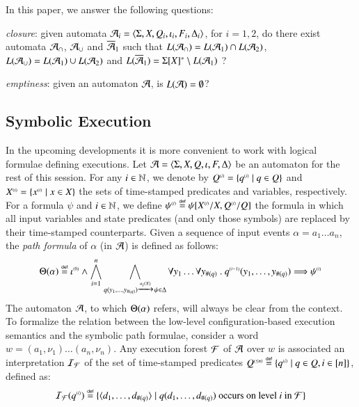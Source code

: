 \documentclass{llncs}
\begin{document}
In this paper, we answer the following questions: \begin{compactenum}
\item \emph{closure}: given automata $\mathcal{A}_i =
  \langle \Sigma,X,Q_i,\iota_i,F_i,\Delta_i \rangle$, for $i=1,2$, do there
  exist automata $\mathcal{A}_\cap$, $\mathcal{A}_\cup$ and $\overline{\mathcal{A}}_1$ such that
  $L(\mathcal{A}_\cap) = L(\mathcal{A}_1) \cap L(\mathcal{A}_2)$, $L(\mathcal{A}_\cup) = L(\mathcal{A}_1) \cup
  L(\mathcal{A}_2)$ and $L(\overline{\mathcal{A}}_1) = \Sigma[X]^* \setminus L(\mathcal{A}_1)$ ?
%
\item \emph{emptiness}: given an automaton $\mathcal{A}$, is $L(\mathcal{A}) =
  \emptyset$?
\end{compactenum}

\subsection{Symbolic Execution}

In the upcoming developments it is more convenient to work with
logical formulae defining executions. Let $\mathcal{A} =
\langle \Sigma,X,Q,\iota,F,\Delta \rangle$ be an automaton for the rest of
this session. For any $i \in {\bf \mathbb{N}}$, we denote by ${Q}^{\scriptscriptstyle{({i})}} =
\{ {q}^{\scriptscriptstyle{({i})}} \mid q \in Q \}$ and ${X}^{\scriptscriptstyle{({i})}} = \{ {x}^{\scriptscriptstyle{({i})}}
  \mid x \in X \}$ the sets of time-stamped predicates and variables,
respectively. For a formula $\psi$ and $i \in {\bf \mathbb{N}}$, we define
${\psi}^{\scriptscriptstyle{({i})}} \stackrel{\scriptscriptstyle{\mathsf{def}}}{=} \psi[{X}^{\scriptscriptstyle{({i})}}/X,{Q}^{\scriptscriptstyle{({i})}}/Q]$ the
formula in which all input variables and state predicates (and only
those symbols) are replaced by their time-stamped counterparts. Given
a sequence of input events $\alpha = a_1 \ldots a_n$, the \emph{path
  formula} of $\alpha$ (in $\mathcal{A}$) is defined as follows:
\[\Theta({\alpha}) \stackrel{\scriptscriptstyle{\mathsf{def}}}{=} {\iota}^{\scriptscriptstyle{({0})}} \wedge 
\bigwedge_{i=1}^n \bigwedge_{q(y_1,\ldots,y_{\#(q)}) \xrightarrow{{\scriptscriptstyle a_i(X)}}_{{\scriptstyle }}
  \psi \in \Delta} \forall y_1 \ldots \forall y_{\#(q)} ~.~
{q}^{\scriptscriptstyle{({i-1})}}(y_1,\ldots,y_{\#(q)}) \Longrightarrow {\psi}^{\scriptscriptstyle{({i})}}\]
The automaton $\mathcal{A}$, to which $\Theta({\alpha})$ refers, will always
be clear from the context. To formalize the relation between the
low-level configuration-based execution semantics and the symbolic
path formulae, consider a word $w=(a_1,\nu_1) \ldots (a_n,\nu_n)$. Any
execution forest $\mathcal{F}$ of $\mathcal{A}$ over $w$ is associated an interpretation
$\mathcal{I}_{\mathcal{F}}$ of the set of time-stamped predicates ${Q}^{\scriptscriptstyle{({\leq n})}}
\stackrel{\scriptscriptstyle{\mathsf{def}}}{=} \{ {q}^{\scriptscriptstyle{({i})}} \mid q \in Q, i \in [n] \}$, defined as: 
\[\mathcal{I}_{\mathcal{F}}({q}^{\scriptscriptstyle{({i})}}) \stackrel{\scriptscriptstyle{\mathsf{def}}}{=} \{ \langle d_1,\ldots,d_{\#(q)} \rangle \mid
  q(d_1,\ldots,d_{\#(q)}) \text{ occurs on level $i$ in $\mathcal{F}$} \}\]
\end{document}
